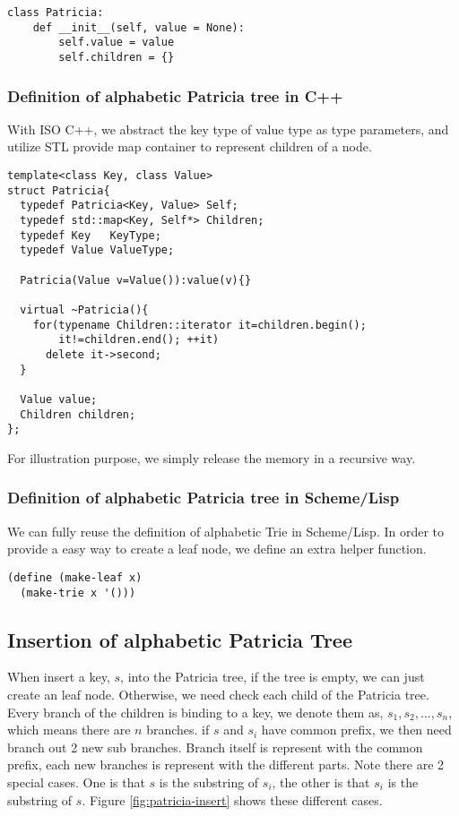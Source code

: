 \documentclass{article}
\begin{document}
\lstset{language=Python}
\begin{lstlisting}
class Patricia:
    def __init__(self, value = None):
        self.value = value
        self.children = {}
\end{lstlisting}

\subsubsection*{Definition of alphabetic Patricia tree in C++}

With ISO C++, we abstract the key type of value type as type
parameters, and utilize STL provide map container to represent
children of a node.

\lstset{language=C++}
\begin{lstlisting}
template<class Key, class Value>
struct Patricia{
  typedef Patricia<Key, Value> Self;
  typedef std::map<Key, Self*> Children;
  typedef Key   KeyType;
  typedef Value ValueType;

  Patricia(Value v=Value()):value(v){}

  virtual ~Patricia(){
    for(typename Children::iterator it=children.begin();
        it!=children.end(); ++it)
      delete it->second;
  }

  Value value;
  Children children;
};
\end{lstlisting}

For illustration purpose, we simply release the memory in a recursive
way.

\subsubsection*{Definition of alphabetic Patricia tree in Scheme/Lisp}

We can fully reuse the definition of alphabetic Trie in Scheme/Lisp.
In order to provide a easy way to create a leaf node, we define an
extra helper function.

\lstset{language=lisp}
\begin{lstlisting}
(define (make-leaf x)
  (make-trie x '()))
\end{lstlisting}

\subsection{Insertion of alphabetic Patricia Tree}
When insert a key, $s$, into the Patricia tree, if the tree is empty, we
can just create an leaf node. Otherwise, we need check each child of the
Patricia tree. Every branch of the children is binding to a key, we denote
them as, $s_1, s_2, ..., s_n$, which means there are $n$ branches.
if $s$ and $s_i$ have common prefix, we then need branch out 2 new sub
branches. Branch itself is represent with the common prefix, each new
branches is represent with the different parts. Note there are 2 special
cases. One is that $s$ is the substring of $s_i$, the other is that $s_i$
is the substring of $s$. Figure \ref{fig:patricia-insert} shows these
different cases.
\end{document}
